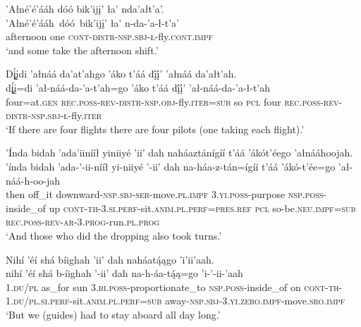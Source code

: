\ea\label{ex:text9-10-6}
’Ałné’é’ááh dóó bik’ijį’ ła’ nda’ałt’a’.\\
\gll ’Ałné’é’ááh~dóó~{bik’ijį’}	ła’	n-da-’a-ł-t’a’\\
     afternoon	one	\textsc{cont}-\textsc{distr}-\textsc{nsp}.\textsc{sbj}-\textsc{ł}-fly.\textsc{cont}.\textsc{impf}\\
\glt `and some take the afternoon shift.'
\z

\ea\label{ex:text9-10-7}
Dį̨́įdi ’ałnáá da’at’ahgo ’áko t’áá dį́į́’ ’ałnáá da’ałt’ah.\\
\gll dį̨́į=di	’ał-náá-da-’a-t’ah=go	’áko	t’áá	dį́į́’	’ał-náá-da-’a-ł-t’ah\\
     four=at.\textsc{gen}	\textsc{rec}.\textsc{poss}-\textsc{rev}-\textsc{distr}-\textsc{nsp}.\textsc{obj}-fly.\textsc{iter}=\textsc{sub}	so	\textsc{pcl}	four	\textsc{rec}.\textsc{poss}-\textsc{rev}-\textsc{distr}-\textsc{nsp}.\textsc{sbj}-\textsc{ł}-fly.\textsc{iter}\\
\glt `If there are four flights there are four pilots (one taking each flight).'
\z

\ea\label{ex:text9-10-8}
’Índa bidah ’ada’iinííł yiniiyé ’ii’ dah naháaztánígíí t’áá ’ákót’éego ’ałnááhoojah.\\
\gll ’índa	bidah	’ada-’-ii-nííł	yi-niiyé	’-ii’	dah	na-háa-z-tán=ígíí	t’áá	’ákó-t’ée=go	’ał-náá-h-oo-jah\\
     then	off\_it	downward-\textsc{nsp}.\textsc{sbj}-\textsc{ser}-move.\textsc{pl}.\textsc{impf}	3.\textsc{yi}.\textsc{poss}-purpose	\textsc{nsp}.\textsc{poss}-inside\_of	up	\textsc{cont}-\textsc{th}-3.\textsc{si}.\textsc{perf}-sit.\textsc{anim}.\textsc{pl}.\textsc{perf}=\textsc{pres}.\textsc{ref}	\textsc{pcl}	so-be.\textsc{neu}.\textsc{impf}=\textsc{sub}	\textsc{rec}.\textsc{poss}-\textsc{rev}-\textsc{ar}-3.\textsc{prog}-run.\textsc{pl}.\textsc{prog}\\
\glt `And those who did the dropping also took turns.'
\z

\ea\label{ex:text9-10-9}
Nihí ’éí shá bíighah ’ii’ dah naháatą́ągo ’i’ii’aah.\\
\gll nihí	’éí	shá b-íighah	’-ii’	dah	na-h-áa-tą́ą=go	’i-’-ii-’aah\\
     1.\textsc{du}/\textsc{pl}	as\_for	sun 3.\textsc{bi}.\textsc{poss}-proportionate\_to	\textsc{nsp}.\textsc{poss}-inside\_of	on	\textsc{cont}-\textsc{th}-1.\textsc{du}/\textsc{pl}.\textsc{si}.\textsc{perf}-sit.\textsc{anim}.\textsc{pl}.\textsc{perf}=\textsc{sub}	away-\textsc{nsp}.\textsc{sbj}-3.\textsc{yi}.\textsc{zero}.\textsc{impf}-move.\textsc{sro}.\textsc{impf}\\
\glt `But we (guides) had to stay aboard all day long.'
\z

